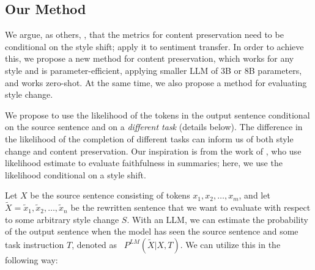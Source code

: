 \subsection{Our Method} We argue, as others, \citep{mir-etal-2019-evaluating}, that the metrics for content preservation need to be conditional on the style shift; \citep{mir-etal-2019-evaluating} apply it to sentiment transfer. 
 In order to achieve this, we propose a new method for content preservation, which works for any style and is parameter-efficient, applying smaller LLM of 3B or 8B parameters, and works zero-shot. At the same time, we also propose a method for evaluating style change. 

We propose to use the likelihood of the tokens in the output sentence conditional on the source sentence and on a \textit{different task} (details below). The difference in the likelihood of the completion of different tasks can inform us of both style change and content preservation. Our inspiration is from the work of \citet{jia-etal-2023-zero}, who use likelihood estimate to evaluate faithfulness in summaries; here, we use the likelihood conditional on a style shift.

Let \( X \) be the source sentence consisting of tokens \( x_1, x_2, \dots, x_m \), and let \( \tilde{X} = \tilde{x}_1, \tilde{x}_2, \dots, \tilde{x}_n \) be the rewritten sentence that we want to evaluate with respect to some arbitrary style change \( S \). With an LLM, we can estimate the probability of the output sentence when the model has seen the source sentence and some task instruction \( T \), denoted as \  \( P^{LM}(\tilde{X}|X,T) \). We can utilize this in the following way:

